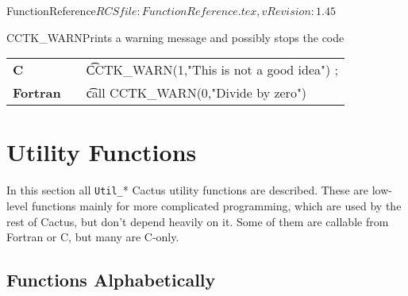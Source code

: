 \begin{cactuspart}{5}{FunctionReference}{$RCSfile: FunctionReference.tex,v $}{$Revision: 1.45 $}
\begin{CCTKFunc}{CCTK\_WARN}{Prints a warning message and possibly stops the code}
\begin{discussion}
{}
\end{discussion}
\begin{examples}
\begin{tabular}{@{}p{3cm}cp{11cm}}
\hfill {\bf C} && {\t CCTK\_WARN(1,"This is not a good idea") };
\\
\hfill {\bf Fortran} && {\t call CCTK\_WARN(0,"Divide by zero")}
\\
\end{tabular}
\end{examples}
\begin{errorcodes}
\end{errorcodes}
\end{CCTKFunc}


\chapter{Utility Functions}
\label{sect-FunctionReference/UtilityFunctions}

In this section all \hbox{{\tt Util\_}*} Cactus utility functions are
described.  These are low-level functions mainly for more complicated
programming, which are used by the rest of Cactus, but don't depend
heavily on it.  Some of them are callable from Fortran or C, but
many are C-only.


\section{Functions Alphabetically}

\begin{Lentry}






\end{Lentry}
\end{cactuspart}
